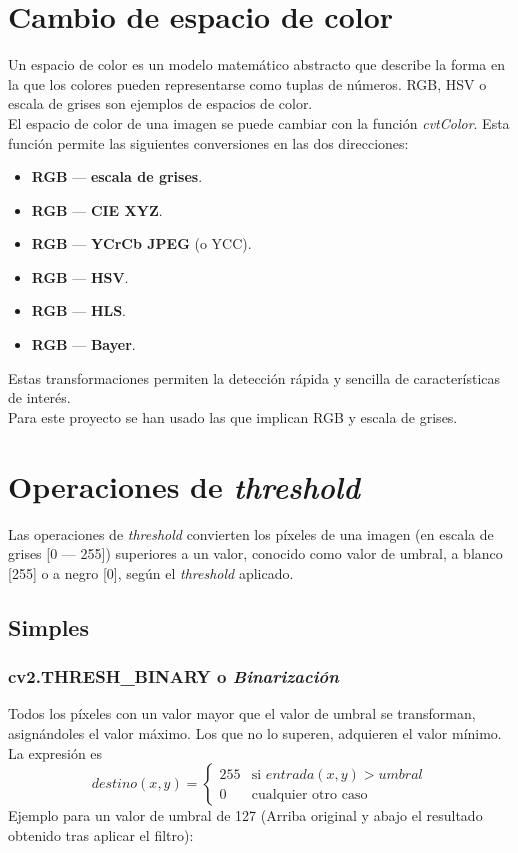 \section{Cambio de espacio de color}
Un espacio de color es un modelo matemático abstracto que describe la
forma en la que los colores pueden representarse como tuplas de
números. RGB, HSV o escala de grises son ejemplos de espacios de color. \\
El espacio de color de una imagen se puede cambiar con la función
\emph{cvtColor}. Esta función permite las siguientes conversiones en
las dos direcciones:
\begin{itemize}
\item \textbf{RGB} --- \textbf{escala de grises}.
\item \textbf{RGB} --- \textbf{CIE XYZ}.
\item \textbf{RGB} --- \textbf{YCrCb JPEG} (o YCC).
\item \textbf{RGB} --- \textbf{HSV}.
\item \textbf{RGB} --- \textbf{HLS}.
\item \textbf{RGB} --- \textbf{Bayer}.
\end{itemize}
Estas transformaciones permiten la detección rápida y sencilla de
características de interés. \\
Para este proyecto se han usado las que implican RGB y escala de
grises.

\section{Operaciones de \emph{threshold}}
Las operaciones de \emph{threshold} convierten los píxeles de una
imagen (en escala de grises [0 --- 255]) superiores a un valor,
conocido como valor de umbral, a blanco [255] o a negro [0], según el
\emph{threshold} aplicado.
\subsection{Simples}
\subsubsection{cv2.THRESH\_BINARY o \emph{Binarización}}
Todos los píxeles con un valor mayor que el valor de umbral se
transforman, asignándoles el valor máximo. Los que no lo superen,
adquieren el valor mínimo.  La expresión es
\begin{equation*}
  destino(x, y) =
  \begin{cases}
    255 & \text{si } entrada(x, y) > umbral \\
    0 & \text{cualquier otro caso}
  \end{cases}
\end{equation*}
Ejemplo para un valor de umbral de 127 (Arriba original y abajo el
resultado obtenido tras aplicar el filtro):

